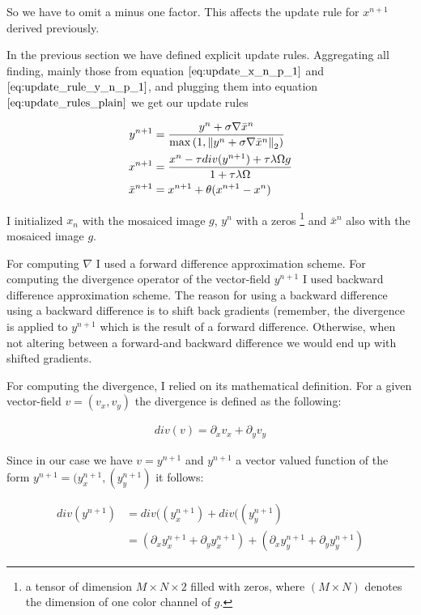 So we have to omit a minus one factor. This affects the update rule for $x^{n+1}$ derived previously.

In the previous section we have defined explicit update rules. Aggregating all finding, mainly those from equation $\ref{eq:update_x_n_p_1}$ and $\ref{eq:update_rule_y_n_p_1}$, and plugging them into equation $\ref{eq:update_rules_plain}$ we get our update rules


\begin{align}
	y^{n+1} &= \frac{y^n + \sigma \nabla \bar{x}^{n}}{\max{\left(1,\left\lVert y^n + \sigma \nabla \bar{x}^{n}\right\rVert_2 \right)}} \nonumber \\
	x^{n+1} &= \frac{x^n - \tau div(y^{n+1}) +  \tau \lambda \Omega g}{1+\tau \lambda \Omega} \\
	\bar{x}^{n+1} &= x^{n+1} + \theta(x^{n+1} - x^n)
\label{eq:final_update_rules_plain}	
\end{align}

I initialized $x_n$ with the mosaiced image $g$, $y^{n}$ with a zeros \footnote{a tensor of dimension $M \times N \times 2$ filled with zeros, where $(M \times N)$ denotes the dimension of one color channel of $g$.} and $\bar{x}^{n}$ also with the mosaiced image $g$.

For computing $\nabla$ I used a forward difference approximation scheme. For computing the divergence operator of the vector-field $y^{n+1}$ I used backward difference approximation scheme. The reason for using a backward difference using a backward difference is to shift back gradients (remember, the divergence is applied to $y^{n+1}$ which is the result of a forward difference. Otherwise, when not altering between a forward-and backward difference we would end up with shifted gradients.

For computing the divergence, I relied on its mathematical definition. For a given vector-field $v = (v_x, v_y)$ the divergence is defined as the following:

\begin{align}
	div(v) = \partial_x v_x + \partial_y v_y
\end{align}

Since in our case we have $v = y^{n+1}$ and $y^{n+1}$ a vector valued function of the form $y^{n+1} = (y_{x}^{n+1}, (y_{y}^{n+1})$ it follows:

\begin{align}
	div(y^{n+1}) 
	&= div((y_{x}^{n+1}) + div((y_{y}^{n+1}) \\
	&= \left( \partial_x y_{x}^{n+1} + \partial_y y_{x}^{n+1} \right) + \left( \partial_x y_{y}^{n+1} + \partial_y y_{y}^{n+1} \right)
\end{align}

